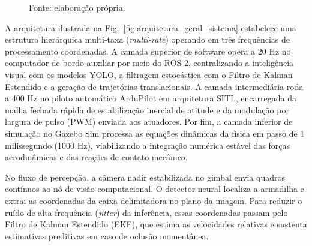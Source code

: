 \begin{figure}[H]

    \vspace{0.2cm}

    \begin{flushleft}
        \footnotesize Fonte: elaboração própria.
    \end{flushleft}
\end{figure}

A arquitetura ilustrada na Fig.~\ref{fig:arquitetura_geral_sistema} estabelece uma estrutura hierárquica multi-taxa (\textit{multi-rate}) operando em três frequências de processamento coordenadas. A camada superior de software opera a 20 Hz no computador de bordo auxiliar por meio do ROS 2, centralizando a inteligência visual com os modelos YOLO, a filtragem estocástica com o Filtro de Kalman Estendido e a geração de trajetórias translacionais. A camada intermediária roda a 400 Hz no piloto automático ArduPilot em arquitetura SITL, encarregada da malha fechada rápida de estabilização inercial de atitude e da modulação por largura de pulso (PWM) enviada aos atuadores. Por fim, a camada inferior de simulação no Gazebo Sim processa as equações dinâmicas da física em passo de 1 milissegundo (1000 Hz), viabilizando a integração numérica estável das forças aerodinâmicas e das reações de contato mecânico.

No fluxo de percepção, a câmera nadir estabilizada no gimbal envia quadros contínuos ao nó de visão computacional. O detector neural localiza a armadilha e extrai as coordenadas da caixa delimitadora no plano da imagem. Para reduzir o ruído de alta frequência (\textit{jitter}) da inferência, essas coordenadas passam pelo Filtro de Kalman Estendido (EKF), que estima as velocidades relativas e sustenta estimativas preditivas em caso de oclusão momentânea.

